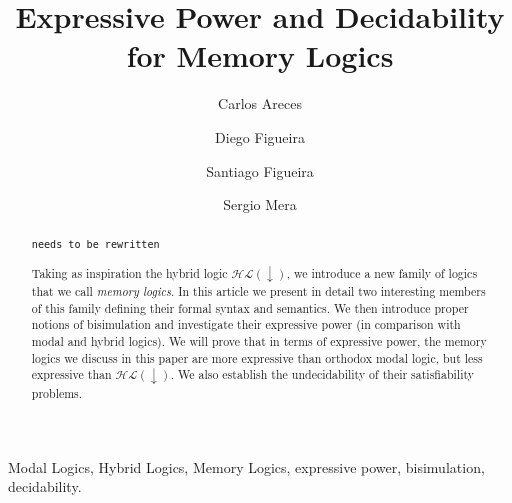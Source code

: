 \documentclass{elsarticle}
\newcounter{tbsnr}
\newenvironment{tbs}
{\addtocounter{tbsnr}{1}\par\bigskip \noindent\fbox{\thetbsnr}
\hspace*{\fill}\begin{minipage}{12cm}\tt}
{\end{minipage}\hspace*{\fill}\bigskip}
\newcommand{\tb}[1]{\begin{tbs}{\footnotesize #1}\end{tbs}}
\newcommand{\down}{{\downarrow}}
\newlength{\esize}\settowidth{\esize}{\texttt{e}}
\newcommand{\HL}{\mathcal{HL}}
\begin{document}
\begin{frontmatter}
\title{Expressive Power and Decidability for Memory Logics}

\author[LORIA]       {Carlos Areces}
\author[CACHAN]      {Diego Figueira}
\author[UBA,CONICET] {Santiago Figueira}
\author[UBA]         {Sergio Mera}
\address[LORIA]      {INRIA Nancy Grand Est, France}
\address[CACHAN]     {LSV, ENS Cachan, CNRS, INRIA Saclay, France}
\address[UBA]        {Departamento de Computaci\'on, FCEyN\\Universidad de Buenos Aires, Argentina}
\address[CONICET]        {CONICET, Argentina}


\begin{abstract}
\tb{needs to be rewritten}
Taking as inspiration the hybrid logic $\HL(\down)$, we introduce a
new family of logics that we call \emph{memory logics}.  In this
article we present in detail two interesting members of this family
defining their formal syntax and semantics. We then introduce
proper notions of bisimulation and investigate their expressive power
(in comparison with modal and hybrid logics). We will prove that in
terms of expressive power, the memory logics we discuss in this
paper are more expressive than orthodox modal logic, but less
expressive than $\HL(\down)$. We also establish the undecidability
of their satisfiability problems.
\end{abstract}

\begin{keyword}
Modal Logics, Hybrid Logics, Memory Logics, expressive power, bisimulation,
decidability.
\end{keyword}
\end{frontmatter}







%
%




\end{document}
